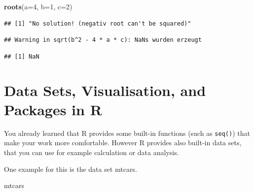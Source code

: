\documentclass[]{report}
\newenvironment{Shaded}{\begin{snugshade}}{\end{snugshade}}
\newcommand{\KeywordTok}[1]{\textcolor[rgb]{0.13,0.29,0.53}{\textbf{#1}}}
\newcommand{\DataTypeTok}[1]{\textcolor[rgb]{0.13,0.29,0.53}{#1}}
\newcommand{\DecValTok}[1]{\textcolor[rgb]{0.00,0.00,0.81}{#1}}
\newcommand{\NormalTok}[1]{#1}
\begin{document}
\begin{Shaded}
\begin{Highlighting}[]
\KeywordTok{roots}\NormalTok{(}\DataTypeTok{a=}\DecValTok{4}\NormalTok{, }\DataTypeTok{b=}\DecValTok{1}\NormalTok{, }\DataTypeTok{c=}\DecValTok{2}\NormalTok{)}
\end{Highlighting}
\end{Shaded}

\begin{verbatim}
## [1] "No solution! (negativ root can't be squared)"
\end{verbatim}

\begin{verbatim}
## Warning in sqrt(b^2 - 4 * a * c): NaNs wurden erzeugt
\end{verbatim}

\begin{verbatim}
## [1] NaN
\end{verbatim}

\chapter{Data Sets, Visualisation, and Packages in
R}\label{data-sets-visualisation-and-packages-in-r}

You already learned that R provides some built-in functions (such as
\texttt{seq()}) that make your work more comfortable. However R provides
also built-in data sets, that you can use for example calculation or
data analysis.

One example for this is the data set mtcars.

\begin{Shaded}
\begin{Highlighting}[]
\NormalTok{mtcars}
\end{Highlighting}
\end{Shaded}
\end{document}
